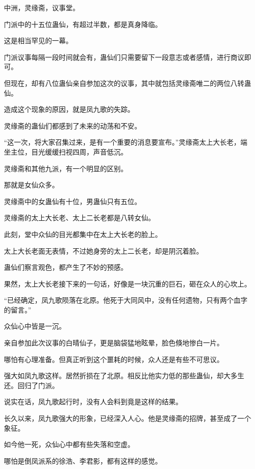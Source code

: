 
\begin{this_body}

中洲，灵缘斋，议事堂。

门派中的十五位蛊仙，有超过半数，都是真身降临。

这是相当罕见的一幕。

门派议事每隔一段时间就会有，蛊仙们只需要留下一段意志或者感情，进行商议即可。

但现在，却有八位蛊仙亲自参加这次的议事，其中就包括灵缘斋唯二的两位八转蛊仙。

造成这个现象的原因，就是凤九歌的失踪。

灵缘斋的蛊仙们都感到了未来的动荡和不安。

“这一次，将大家召集过来，是有一个重要的消息要宣布。”灵缘斋太上大长老，端坐主位，目光缓缓扫视四周，声音低沉。

灵缘斋和其他九派，有一个明显的区别。

那就是女仙众多。

灵缘斋中的女蛊仙有十位，男蛊仙只有五位。

灵缘斋的太上大长老、太上二长老都是八转女仙。

此刻，堂中众仙的目光都集中在太上大长老的脸上。

太上大长老面无表情，不过她身旁的太上二长老，却是阴沉着脸。

蛊仙们察言观色，都产生了不妙的预感。

果然，太上大长老接下来的一句话，好像是一块沉重的巨石，砸在众人的心坎上。

“已经确定，凤九歌陨落在北原。他死于大同风中，没有任何遗物，只有两个血字的留言。”

众仙心中皆是一沉。

亲自参加此次议事的白晴仙子，更是脑袋猛地眩晕，脸色倏地惨白一片。

哪怕有心理准备。但真正听到这个噩耗的时候，众人还是有些不可思议。

强大如凤九歌这样。居然折损在了北原。相反比他实力低的那些蛊仙，却大多生还。回归了门派。

说实在话，凤九歌起行时，没有人会料到竟是这样的结果。

长久以来，凤九歌强大的形象，已经深入人心。他是灵缘斋的招牌，甚至成了一个象征。

如今他一死，众仙心中都有些失落和空虚。

哪怕是倒凤派系的徐浩、李君影，都有这样的感觉。


\end{this_body}
